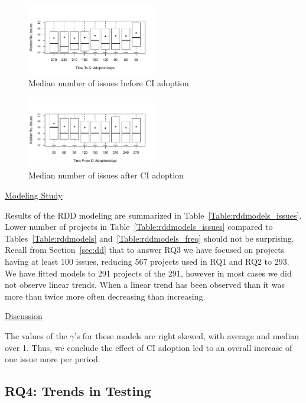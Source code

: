 \begin{figure}[!t]
\centering
\includegraphics[width=0.5\textwidth]{issues_before.pdf}
\caption{Median number of issues before CI adoption}
\label{Fig:IssuesBefore}
\end{figure}


\begin{figure}[!t]
\centering
\includegraphics[width=0.5\textwidth]{issues_after.pdf}
\caption{Median number of issues after CI adoption}
\label{Fig:IssuesAfter}
\end{figure}

\noindent \underline{Modeling Study}

Results of the RDD modeling are summarized in Table~\ref{Table:rddmodels_issues}.
Lower number of projects in Table~\ref{Table:rddmodels_issues} compared to Tables~\ref{Table:rddmodels} 
and~\ref{Table:rddmodels_freq} should not be surprising. 
Recall from Section~\ref{sec:dd} that to answer RQ3 we have focused on projects having at least 100 issues,
 reducing 567 projects used in RQ1 and RQ2 to 293.
We have fitted models to 291 projects of the 291, however in most cases we did not observe linear trends.
When a linear trend has been observed than it was more than twice more often decreasing than increasing.



\noindent \underline{Discussion}


The values of the $\gamma$'s for these models are right skewed, with average and median over 1. Thus, we conclude the effect of CI adoption led to an overall increase of one issue more per period.




\subsection{RQ4: Trends in Testing}

